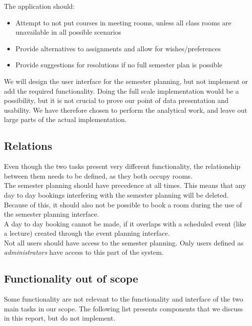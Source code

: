 The application should:

\begin{itemize}
	\item Attempt to not put courses in meeting rooms, unless all class rooms are unavailable in all possible scenarios
	\item Provide alternatives to assignments and allow for wishes/preferences
	\item Provide suggestions for resolutions if no full semester plan is possible
\end{itemize}


We will design the user interface for the semester planning, but not implement or add the required functionality. Doing the full scale implementation would be a possibility, but it is not crucial to prove our point of data presentation and usability. We have therefore chosen to perform the analytical work, and leave out large parts of the actual implementation.

\subsection{Relations}
Even though the two tasks present very different functionality, the relationship between them needs to be defined, as they both occupy rooms. \\

The semester planning should have precedence at all times. This means that any day to day bookings interfering with the semester planning will be deleted. Because of this, it should also not be possible to book a room during the use of the semester planning interface. \\
A day to day booking cannot be made, if it overlaps with a scheduled event (like a lecture) created through the event planning interface.\\

Not all users should have access to the semester planning. Only users defined as \emph{administrators} have access to this part of the system.

\subsection{Functionality out of scope}
Some functionality are not relevant to the functionality and interface of the two main tasks in our scope. The following list presents components that we discuss in this report, but do not implement.


